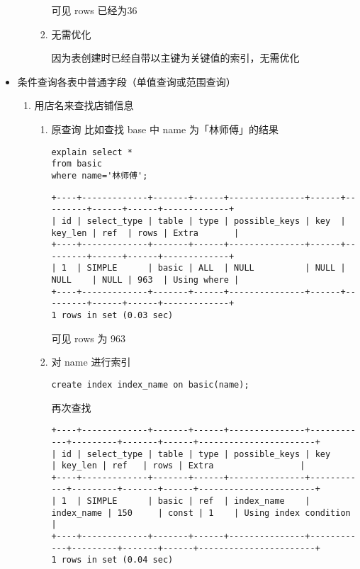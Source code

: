 \documentclass[11pt]{article}
\begin{document}
\begin{itemize}
\begin{enumerate}
\begin{enumerate}
可见 rows 已经为36

\item 无需优化

因为表创建时已经自带以主键为关键值的索引，无需优化
\end{enumerate}
\end{enumerate}
\item 条件查询各表中普通字段（单值查询或范围查询）
\label{sec-3-2-1-5}
\begin{enumerate}
\item 用店名来查找店铺信息
\begin{enumerate}
\item 原查询
比如查找 base 中 name 为「林师傅」的结果

\begin{lstlisting}
explain select *
from basic
where name='林师傅';
\end{lstlisting}

\begin{verbatim}
+----+-------------+-------+------+---------------+------+---------+------+------+-------------+
| id | select_type | table | type | possible_keys | key  | key_len | ref  | rows | Extra       |
+----+-------------+-------+------+---------------+------+---------+------+------+-------------+
| 1  | SIMPLE      | basic | ALL  | NULL          | NULL | NULL    | NULL | 963  | Using where |
+----+-------------+-------+------+---------------+------+---------+------+------+-------------+
1 rows in set (0.03 sec)
\end{verbatim}

可见 rows 为 963

\item 对 name 进行索引

\begin{lstlisting}
create index index_name on basic(name);
\end{lstlisting}

再次查找

\begin{verbatim}
+----+-------------+-------+------+---------------+------------+---------+-------+------+-----------------------+
| id | select_type | table | type | possible_keys | key        | key_len | ref   | rows | Extra                 |
+----+-------------+-------+------+---------------+------------+---------+-------+------+-----------------------+
| 1  | SIMPLE      | basic | ref  | index_name    | index_name | 150     | const | 1    | Using index condition |
+----+-------------+-------+------+---------------+------------+---------+-------+------+-----------------------+
1 rows in set (0.04 sec)
\end{verbatim}


\end{enumerate}
\end{enumerate}
\end{itemize}
\end{document}
